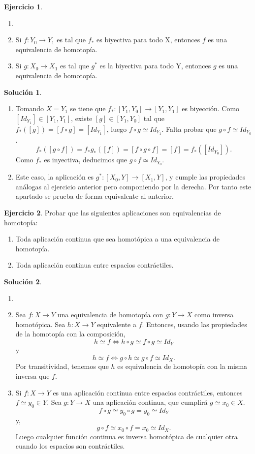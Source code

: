 \documentclass{article}
\theoremstyle{plain}
\theoremstyle{definition}
\newtheorem{exercise}{Ejercicio}
\newtheorem*{sol*}{Solución}
\begin{document}
\newpage
\begin{exercise}
\begin{enumerate}
\item[]
\item Si $f:Y_0\to Y_1$ es tal que $f_*$ es biyectiva para todo X, entonces $f$ es una equivalencia de homotopía.
\item Si $g:X_0\to X_1$ es tal que $g^*$ es la biyectiva para todo Y, entonces $g$ es una equivalencia de homotopía.
\end{enumerate}
\begin{sol*}
\begin{enumerate}\
\item Tomando $X=Y_1$ se tiene que $f_*:[Y_1,Y_0]\rightarrow[Y_1,Y_1]$ es biyección. Como $[Id_{Y_1}]\in [Y_1,Y_1]$, existe $[g]\in [Y_1,Y_0]$ tal que $f_*([g])=[f\circ g]=[Id_{Y_1}]$, luego $f\circ g\simeq Id_{Y_1}$. Falta probar que $g\circ f\simeq Id_{Y_0}$. 
\[ f_*([g\circ f])=f_*g_*([f])=[f\circ g\circ f]=[f]=f_*([Id_{Y_0}]).\]
Como $f_*$ es inyectiva, deducimos que $g\circ f\simeq Id_{Y_0}$.
\item Este caso, la aplicación es $g^*:[X_0,Y]\to [X_1,Y]$, y cumple las propiedades análogas al ejercicio anterior pero componiendo por la derecha. Por tanto este apartado se prueba de forma equivalente al anterior. 
\end{enumerate}
\end{sol*}

\end{exercise}
\newpage
\begin{exercise}
Probar que las siguientes aplicaciones son equivalencias de homotopía:
\begin{enumerate}
\item Toda aplicación continua que sea homotópica a una equivalencia de homotopía.
\item Toda aplicación continua entre espacios contráctiles.
\end{enumerate}
\end{exercise}
\begin{sol*}
\begin{enumerate}
\item[]
\item Sea $f:X\to Y$ una equivalencia de homotopía con $g:Y\to X$ como inversa homotópica. Sea $h:X\to Y$ equivalente a $f$. Entonces, usando las propiedades de la homotopía con la composición, 
\[
h\simeq f\Leftrightarrow h\circ g\simeq f\circ g\simeq Id_Y
\]
y
\[
h\simeq f\Leftrightarrow g\circ h\simeq g\circ f\simeq Id_X.
\]
Por transitividad, tenemos que $h$ es equivalencia de homotopía con la misma inversa que $f$. 
\item Si $f:X\to Y$ es una aplicación continua entre espacios contráctiles, entonces $f\simeq y_0\in Y$. Sea $g:Y\to X$ una aplicación continua, que cumplirá $g\simeq x_0\in X$. 
\[
f\circ g\simeq y_0\circ g = y_0\simeq Id_Y
\]
y,
\[
g\circ f\simeq x_0\circ f =x_0\simeq Id_X.
\]
Luego cualquier función continua es inversa homotópica de cualquier otra cuando los espacios son contráctiles. 
\end{enumerate}
\end{sol*}
\end{document}
